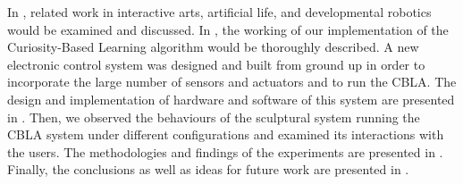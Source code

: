 In , related work in interactive arts, artificial life, and developmental robotics would be examined and discussed. In , the working of our implementation of the Curiosity-Based Learning algorithm would be thoroughly described. A new electronic control system was designed and built from ground up in order to incorporate the large number of sensors and actuators and to run the CBLA. The design and implementation of hardware and software of this system are presented in . Then, we observed the behaviours of the sculptural system running the CBLA system under different configurations and examined its interactions with the users. The methodologies and findings of the experiments are presented in . Finally, the conclusions as well as ideas for future work are presented in .
